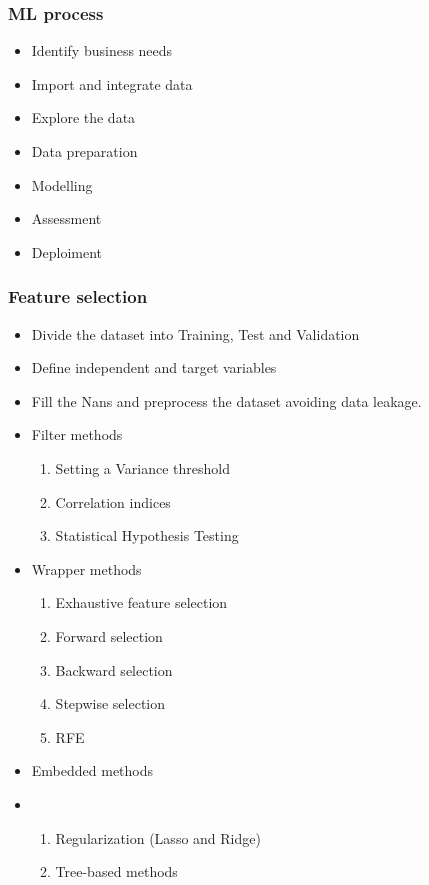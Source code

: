 \subsubsection{ML process}

\begin{itemize}
    \item Identify business needs
    \item Import and integrate data
    \item Explore the data
    \item Data preparation
    \item Modelling
    \item Assessment
    \item Deploiment
\end{itemize}


\subsubsection{Feature selection}

\begin{itemize}
    \item Divide the dataset into Training, Test and Validation
    \item Define independent and target variables
    \item Fill the Nans and preprocess the dataset avoiding data leakage.
    \item Filter methods 
    \begin{enumerate}
        \item Setting a Variance threshold
        \item Correlation indices
        \item Statistical Hypothesis Testing
    \end{enumerate}
    \item Wrapper methods
    \begin{enumerate}
        \item Exhaustive feature selection
        \item Forward selection
        \item Backward selection
        \item Stepwise selection
        \item RFE
    \end{enumerate}
    \item Embedded methods
    \item \begin{enumerate}
        \item Regularization (Lasso and Ridge)
        \item Tree-based methods
    \end{enumerate}
\end{itemize}



